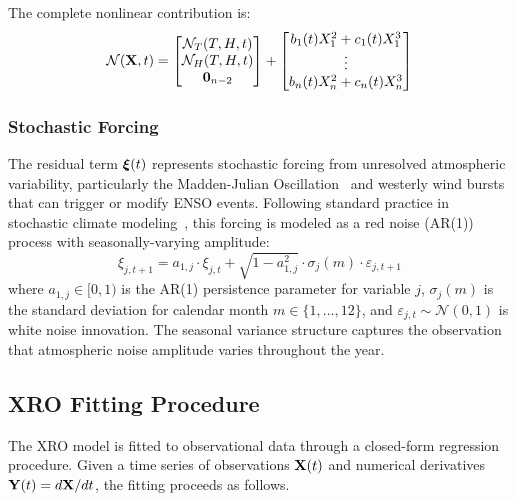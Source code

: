 The complete nonlinear contribution is:
\begin{equation}
    \mathcal{N}(\mathbf{X}, t) = \begin{bmatrix} \mathcal{N}_T(T, H, t) \\ \mathcal{N}_H(T, H, t) \\ \mathbf{0}_{n-2} \end{bmatrix} + \begin{bmatrix} b_1(t) X_1^2 + c_1(t) X_1^3 \\ \vdots \\ b_n(t) X_n^2 + c_n(t) X_n^3 \end{bmatrix}
\end{equation}

\subsubsection{Stochastic Forcing}

The residual term $\boldsymbol{\xi}(t)$ represents stochastic forcing from unresolved atmospheric variability, particularly the Madden-Julian Oscillation~\cite{madden1971detection,zhang2005mjo} and westerly wind bursts~\cite{harrison1997westerly} that can trigger or modify ENSO events. Following standard practice in stochastic climate modeling~\cite{hasselmann1976stochastic,penland1993prediction}, this forcing is modeled as a red noise (AR(1)) process with seasonally-varying amplitude:
\begin{equation}
    \xi_{j,t+1} = a_{1,j} \cdot \xi_{j,t} + \sqrt{1 - a_{1,j}^2} \cdot \sigma_j(m) \cdot \varepsilon_{j,t+1}
    \label{eq:noise}
\end{equation}
where $a_{1,j} \in [0, 1)$ is the AR(1) persistence parameter for variable $j$, $\sigma_j(m)$ is the standard deviation for calendar month $m \in \{1, \ldots, 12\}$, and $\varepsilon_{j,t} \sim \mathcal{N}(0, 1)$ is white noise innovation. The seasonal variance structure captures the observation that atmospheric noise amplitude varies throughout the year.

\subsection{XRO Fitting Procedure}

The XRO model is fitted to observational data through a closed-form regression procedure. Given a time series of observations $\mathbf{X}(t)$ and numerical derivatives $\mathbf{Y}(t) = d\mathbf{X}/dt$, the fitting proceeds as follows.

